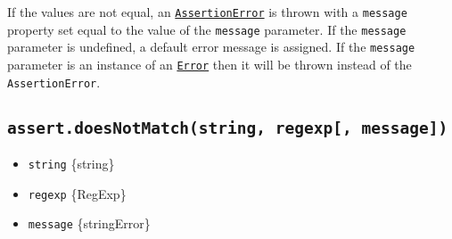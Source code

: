 \begin{Shaded}
\begin{Highlighting}[]
\OperatorTok{=}  \NormalTok{()}\OperatorTok{;}
\OperatorTok{=}  \NormalTok{([[\{\}}\OperatorTok{,}\NormalTok{ \{\}]])}\OperatorTok{;}
\OperatorTok{=}  \NormalTok{()}\OperatorTok{;}
 \OperatorTok{=} \OperatorTok{;}

\OperatorTok{,}\OperatorTok{;}

\OperatorTok{,}\OperatorTok{;}
\CommentTok{//}
\CommentTok{//   \}}
\end{Highlighting}
\end{Shaded}

If the values are not equal, an
\hyperref[class-assertassertionerror]{\texttt{AssertionError}} is thrown
with a \texttt{message} property set equal to the value of the
\texttt{message} parameter. If the \texttt{message} parameter is
undefined, a default error message is assigned. If the \texttt{message}
parameter is an instance of an
\href{errors.md\#class-error}{\texttt{Error}} then it will be thrown
instead of the \texttt{AssertionError}.

\subsection{\texorpdfstring{\texttt{assert.doesNotMatch(string,\ regexp{[},\ message{]})}}{assert.doesNotMatch(string, regexp{[}, message{]})}}\label{assert.doesnotmatchstring-regexp-message}

\begin{itemize}
\tightlist
\item
  \texttt{string} \{string\}
\item
  \texttt{regexp} \{RegExp\}
\item
  \texttt{message} \{string\textbar Error\}
\end{itemize}

